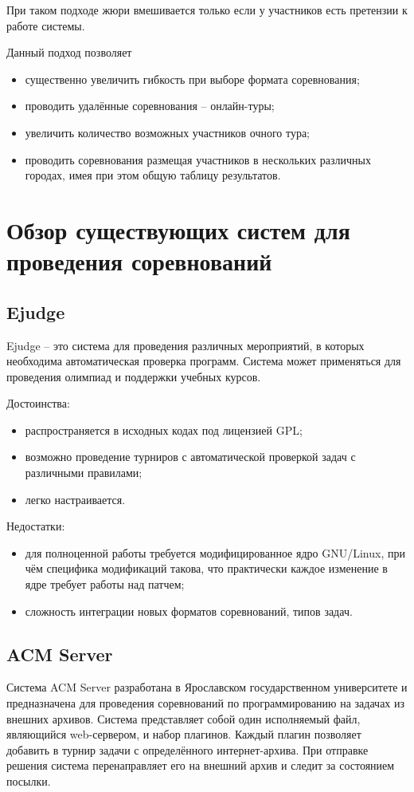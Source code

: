 При таком подходе жюри вмешивается только если у участников есть претензии к работе системы.

Данный подход позволяет
\begin{itemize}
    \item существенно увеличить гибкость при выборе формата соревнования;
    \item проводить удалённые соревнования -- онлайн-туры;
    \item увеличить количество возможных участников очного тура;
    \item проводить соревнования размещая участников в нескольких различных городах,
        имея при этом общую таблицу результатов.
\end{itemize}

\section{Обзор существующих систем для проведения соревнований}
\subsection{Ejudge}
Ejudge \cite{ejudge} -- это система для проведения различных мероприятий,
в которых необходима автоматическая проверка программ.
Система может применяться для проведения олимпиад и поддержки учебных курсов.

Достоинства:
\begin{itemize}
    \item распространяется в исходных кодах под лицензией GPL;
    \item возможно проведение турниров с автоматической проверкой задач с различными правилами;
    \item легко настраивается.
\end{itemize}

Недостатки:
\begin{itemize}
    \item для полноценной работы требуется модифицированное ядро GNU/Linux,
        при чём специфика модификаций такова, что практически каждое изменение в ядре
        требует работы над патчем;
    \item сложность интеграции новых форматов соревнований, типов задач.
\end{itemize}

\subsection{ACM Server}
Система ACM Server \cite{acmserver} разработана в Ярославском государственном
университете и предназначена для проведения соревнований по программированию на задачах из внешних архивов.
Система представляет собой один исполняемый файл, являющийся web-сервером, и набор плагинов.
Каждый плагин позволяет добавить в турнир задачи с определённого интернет-архива.
При отправке решения система перенаправляет его на внешний архив и следит за состоянием посылки.

